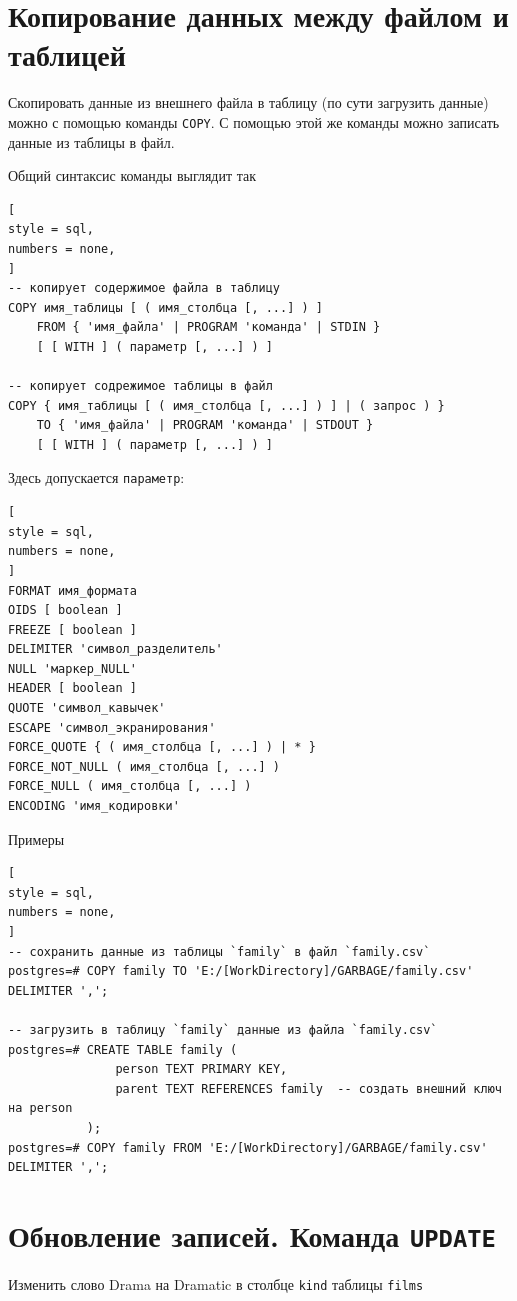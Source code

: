 \documentclass[%
	11pt,
	a4paper,
	utf8,
		]{article}
\begin{document}
\section{Копирование данных между файлом и таблицей}

Скопировать данные из внешнего файла в таблицу (по сути загрузить данные) можно с помощью команды \texttt{COPY}. С помощью этой же команды можно записать данные из таблицы в файл.

Общий синтаксис команды выглядит так
\begin{lstlisting}[
style = sql,
numbers = none,
]
-- копирует содержимое файла в таблицу
COPY имя_таблицы [ ( имя_столбца [, ...] ) ]
    FROM { 'имя_файла' | PROGRAM 'команда' | STDIN }
    [ [ WITH ] ( параметр [, ...] ) ]

-- копирует содрежимое таблицы в файл
COPY { имя_таблицы [ ( имя_столбца [, ...] ) ] | ( запрос ) }
    TO { 'имя_файла' | PROGRAM 'команда' | STDOUT }
    [ [ WITH ] ( параметр [, ...] ) ]
\end{lstlisting}

Здесь допускается \texttt{параметр}:
\begin{lstlisting}[
style = sql,
numbers = none,
]
FORMAT имя_формата
OIDS [ boolean ]
FREEZE [ boolean ]
DELIMITER 'символ_разделитель'
NULL 'маркер_NULL'
HEADER [ boolean ]
QUOTE 'символ_кавычек'
ESCAPE 'символ_экранирования'
FORCE_QUOTE { ( имя_столбца [, ...] ) | * }
FORCE_NOT_NULL ( имя_столбца [, ...] )
FORCE_NULL ( имя_столбца [, ...] )
ENCODING 'имя_кодировки'
\end{lstlisting}

Примеры
\begin{lstlisting}[
style = sql,
numbers = none,
]
-- сохранить данные из таблицы `family` в файл `family.csv`
postgres=# COPY family TO 'E:/[WorkDirectory]/GARBAGE/family.csv' DELIMITER ',';

-- загрузить в таблицу `family` данные из файла `family.csv`
postgres=# CREATE TABLE family (
               person TEXT PRIMARY KEY,
               parent TEXT REFERENCES family  -- создать внешний ключ на person
           );
postgres=# COPY family FROM 'E:/[WorkDirectory]/GARBAGE/family.csv' DELIMITER ',';
\end{lstlisting}

\section{Обновление записей. Команда \texttt{UPDATE}}

Изменить слово Drama на Dramatic в столбце \texttt{kind} таблицы \texttt{films}
\end{document}
